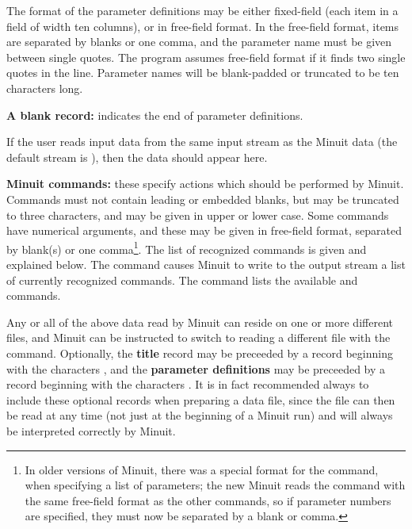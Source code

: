 \begin{UL}
      The format of the parameter definitions may be either
      fixed-field (each item in a field of width ten columns),
      or in free-field format.
      In the free-field format, items are separated by blanks or one comma,
      and the parameter name must be given between single quotes.
      The program assumes free-field format if it finds two single
      quotes in the line.
      Parameter names will be blank-padded or truncated to be
      ten characters long.
\item {\bf A blank record:} indicates the end of parameter definitions.
\item If the user  reads input data from the same input stream as the
       Minuit data (the default stream is ),
       then the  data should appear here.
\item {\bf Minuit commands:} these specify actions which should be performed by Minuit.
       Commands must not contain leading or embedded blanks, but may be
       truncated to three characters, and may be given in upper or lower case.
       Some commands have numerical arguments, and these may be given in
       free-field format, separated by blank(s) or one comma\footnote{%
       In older versions of Minuit, there was a special format for the 
       command, when specifying a list of parameters; the new Minuit reads
       the  command with the same free-field format as the other
       commands, so if parameter numbers are specified, they must now
       be separated by a blank or comma.}.
       The list of recognized commands is given and explained below.
       The command  causes Minuit to write to the output stream a list
       of currently recognized commands.
       The command  lists the available  
       and  commands.
\end{UL}

Any or all of the above data read by Minuit
can reside on one or more different files,
and Minuit can be instructed
to switch to reading a different file with the  command.
Optionally, the {\bf title} record may be preceeded by a record
beginning with the characters , and the
{\bf parameter definitions} may be preceeded by a record
beginning with the characters .
It is in fact recommended always to include these optional
records when preparing a data file, since the file can then be
read at any time (not just at the beginning of a Minuit run)
and will always be interpreted correctly by Minuit.
 
